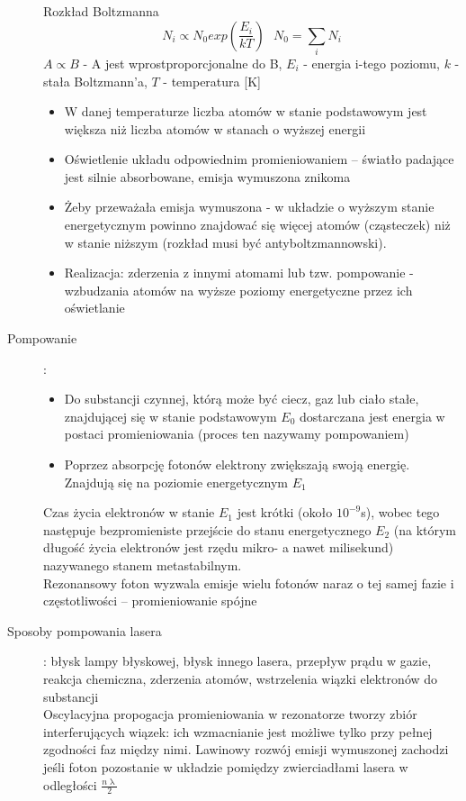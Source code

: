 \documentclass[a4paper,11pt]{article}
\begin{document}
\begin{description}
  Rozkład Boltzmanna
  $$N_i \propto N_0exp\left( \frac{E_i}{kT}\right)\text{     }N_0=\sum\limits_iN_i$$
  $A\propto B$ - A jest wprostproporcjonalne do B, $E_i$ - energia i-tego poziomu, $k$ - stała Boltzmann'a, $T$ - temperatura [K] 
  \begin{itemize}
  \item W danej temperaturze liczba atomów w stanie podstawowym jest większa niż liczba atomów w stanach o wyższej energii
  \item Oświetlenie układu odpowiednim promieniowaniem -- światło padające jest silnie absorbowane, emisja wymuszona znikoma
  \item Żeby przeważała emisja wymuszona - w układzie o wyższym stanie energetycznym powinno znajdować się więcej atomów (cząsteczek) niż w stanie niższym (rozkład musi być antyboltzmannowski).
  \item Realizacja: zderzenia z innymi atomami lub tzw. pompowanie - wzbudzania atomów na wyższe poziomy energetyczne przez ich oświetlanie
  \end{itemize}
\item[Pompowanie]:
  \begin{itemize}
  \item Do substancji czynnej, którą może być ciecz, gaz lub ciało stałe, znajdującej się w stanie podstawowym $E_0$ dostarczana jest energia w postaci promieniowania (proces ten nazywamy pompowaniem)
  \item Poprzez absorpcję fotonów elektrony zwiększają swoją energię. Znajdują się na poziomie energetycznym $E_1$
  \end{itemize}
  Czas życia elektronów w stanie $E_1$ jest krótki (około $10^{-9}$s), wobec tego następuje bezpromieniste przejście do stanu energetycznego $E_2$ (na którym długość życia elektronów jest rzędu mikro- a nawet milisekund) nazywanego stanem metastabilnym.\\
  Rezonansowy foton wyzwala emisje wielu fotonów naraz o tej samej fazie i częstotliwości -- promieniowanie spójne
\item[Sposoby pompowania lasera]: błysk lampy błyskowej, błysk innego lasera, przepływ prądu w gazie, reakcja chemiczna, zderzenia atomów, wstrzelenia wiązki elektronów do substancji\\
  Oscylacyjna propogacja promieniowania w rezonatorze tworzy zbiór interferujących wiązek: ich wzmacnianie jest możliwe tylko przy pełnej zgodności faz między nimi. Lawinowy rozwój emisji wymuszonej zachodzi jeśli foton pozostanie w układzie pomiędzy zwierciadłami lasera w odległości $\frac{n\uplambda}{2}$
  

\end{description}
\end{document}
